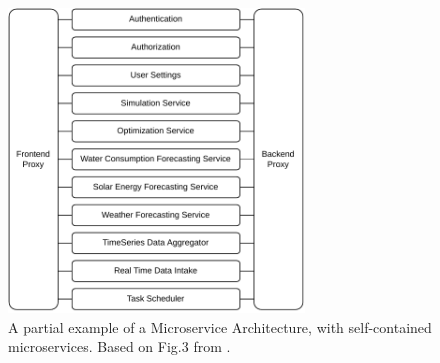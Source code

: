 \begin{figure}[!htbp]
    \centering
    \includegraphics[width=0.70\textwidth]{img/diagrams/pdf/microservice-arch.drawio.pdf}
    \caption[Example Microservice Architecture]{A partial example of a Microservice Architecture, with self-contained microservices. Based on Fig.3 from \parencite{newman_2015}.}
    \label{fig:microservice-arch}
\end{figure}
